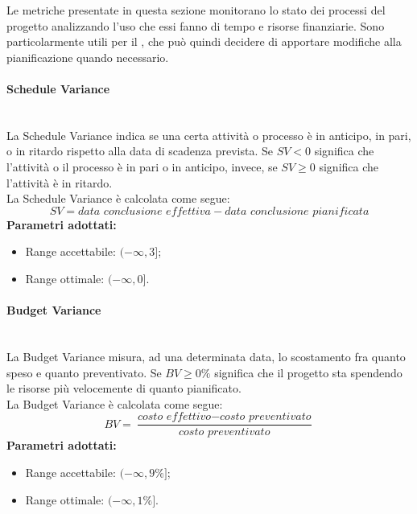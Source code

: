 Le metriche presentate in questa sezione monitorano lo stato dei processi del progetto analizzando l'uso che essi fanno di tempo e risorse finanziarie. Sono particolarmente utili per il \Res , che può quindi decidere di apportare modifiche alla pianificazione quando necessario.

\paragraph{Schedule Variance}\mbox{}\\[0,3cm]
La Schedule Variance indica se una certa attività o processo è in anticipo, in pari, o in ritardo rispetto alla data di scadenza prevista.
Se $SV < 0$ significa che l'attività o il processo è in pari o in anticipo, invece, se $SV \geq 0$ significa che l'attività è in ritardo.\\[0,2cm]
La Schedule Variance è calcolata come segue:
\[
SV = \textit{data conclusione effettiva} - \textit{data conclusione pianificata}
\]
\textbf{Parametri adottati:}
\begin{itemize}
	\item Range accettabile: $(-\infty , 3]$;
	\item Range ottimale: $(-\infty , 0]$.
\end{itemize}

\paragraph{Budget Variance}\mbox{}\\[0,3cm]
La Budget Variance misura, ad una determinata data, lo scostamento fra quanto speso e quanto preventivato. Se $BV \geq 0\%$ significa che il progetto sta spendendo le risorse più velocemente di quanto pianificato.\\[0,2cm]
La Budget Variance è calcolata come segue:
\[
BV = \frac{\textit{costo effettivo} - \textit{costo preventivato}}{\textit{costo preventivato}}
\]
\textbf{Parametri adottati:}
\begin{itemize}
	\item Range accettabile: $(-\infty , 9\%]$;
	\item Range ottimale: $(-\infty , 1\%]$.
\end{itemize}